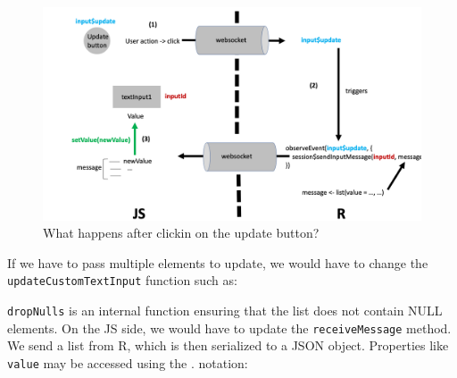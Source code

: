 \documentclass[]{book}
\newenvironment{Shaded}{\begin{snugshade}}{\end{snugshade}}
\newcommand{\ControlFlowTok}[1]{\textcolor[rgb]{0.13,0.29,0.53}{\textbf{#1}}}
\newcommand{\DataTypeTok}[1]{\textcolor[rgb]{0.13,0.29,0.53}{#1}}
\newcommand{\KeywordTok}[1]{\textcolor[rgb]{0.13,0.29,0.53}{\textbf{#1}}}
\newcommand{\NormalTok}[1]{#1}
\newcommand{\OperatorTok}[1]{\textcolor[rgb]{0.81,0.36,0.00}{\textbf{#1}}}
\newcommand{\OtherTok}[1]{\textcolor[rgb]{0.56,0.35,0.01}{#1}}
\newcommand{\StringTok}[1]{\textcolor[rgb]{0.31,0.60,0.02}{#1}}
\begin{document}
\begin{figure}
\includegraphics[width=20in]{images/survival-kit/shiny-update-inputs} \caption{What happens after clickin on the update button?}\label{fig:shiny-update-inputs}
\end{figure}

If we have to pass multiple elements to update, we would have to change the \texttt{updateCustomTextInput} function such as:

\begin{Shaded}
\end{Shaded}

\texttt{dropNulls} is an internal function ensuring that the list does not contain NULL elements. On the JS side, we would have to update the \texttt{receiveMessage} method. We send a list from R, which is then serialized to a JSON object. Properties like \texttt{value} may be accessed using the . notation:
\end{document}

